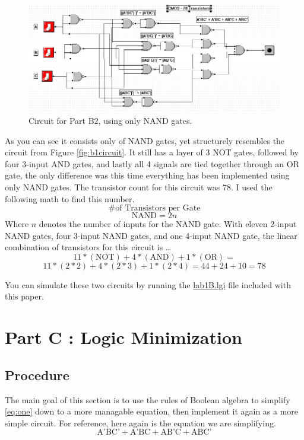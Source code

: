 \documentclass[a4paper,11pt]{article}
\begin{document}
\begin{figure}[h!]
   \centering
     \includegraphics[width=6.5in]{PartB2}
   \caption{Circuit for Part B2, using only NAND gates.}
   \label{fig:b2circuit}
\end{figure}   
As you can see it consists only of NAND gates, yet structurely resembles the circuit from Figure \ref{fig:b1circuit}. It still has a layer of 3 NOT gates, followed by four 3-input AND gates, and lastly all 4 signals are tied together through an OR gate, the only difference was this time everything has been implemented using only NAND gates. The transistor count for this circuit was 78. I used the following math to find this number. 
\[ \text{\# of Transistors per Gate}\]
\[ \text{NAND} = 2n \]
Where $n$ denotes the number of inputs for the NAND gate. With eleven 2-input NAND gates, four 3-input NAND gates, and one 4-input NAND gate, the linear combination of transistors for this circuit is \ldots
\[ 11*(\text{NOT})+4*(\text{AND})+1*(\text{OR}) = \]
\[ 11*(2*2)+4*(2*3)+1*(2*4) = 44+24+10 = 78\]
\par

You can simulate these two circuits by running the \url{lab1B.lgi} file included with this paper.



\section{Part C : Logic Minimization}
\subsection{Procedure}
The main goal of this section is to use the rules of Boolean algebra to simplify \eqref{eq:one} down to a more managable equation, then implement it again as a more simple circuit. For reference, here again is the equation we are simplifying.
\[ \text{A'BC'} + \text{A'BC} + \text{AB'C} + \text{ABC'} \]
\end{document}
